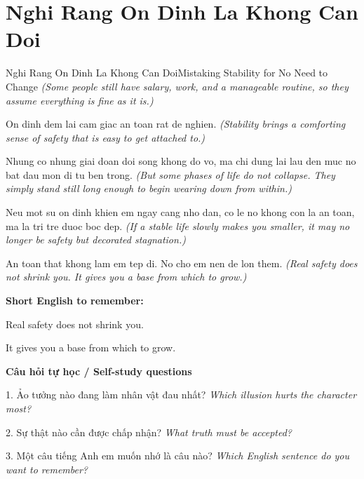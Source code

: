 \section{Nghi Rang On Dinh La Khong Can Doi}
\begin{truyen}{Nghi Rang On Dinh La Khong Can Doi}{Mistaking Stability for No Need to Change}
\textit{(Some people still have salary, work, and a manageable routine, so they assume everything is fine as it is.)}

On dinh dem lai cam giac an toan rat de nghien.
\textit{(Stability brings a comforting sense of safety that is easy to get attached to.)}

Nhung co nhung giai doan doi song khong do vo, ma chi dung lai lau den muc no bat dau mon di tu ben trong.
\textit{(But some phases of life do not collapse. They simply stand still long enough to begin wearing down from within.)}

Neu mot su on dinh khien em ngay cang nho dan, co le no khong con la an toan, ma la tri tre duoc boc dep.
\textit{(If a stable life slowly makes you smaller, it may no longer be safety but decorated stagnation.)}

\end{truyen}

\begin{baihoc}
An toan that khong lam em tep di. No cho em nen de lon them.
\textit{(Real safety does not shrink you. It gives you a base from which to grow.)}
\end{baihoc}

\begin{ghinhoanh}
\textbf{Short English to remember:}

Real safety does not shrink you.

It gives you a base from which to grow.

\end{ghinhoanh}

\begin{tuhocnhanh}
\textbf{Câu hỏi tự học / Self-study questions}

1. Ảo tưởng nào đang làm nhân vật đau nhất? \textit{Which illusion hurts the character most?}

2. Sự thật nào cần được chấp nhận? \textit{What truth must be accepted?}

3. Một câu tiếng Anh em muốn nhớ là câu nào? \textit{Which English sentence do you want to remember?}
\end{tuhocnhanh}
\ngancach

